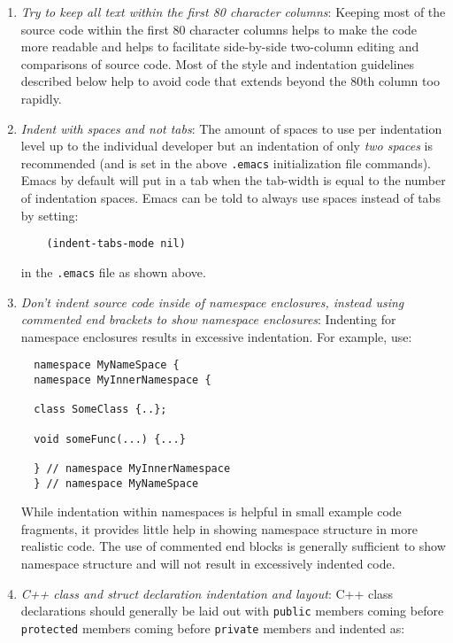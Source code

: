 \begin{enumerate}

{}\item\textit{Try to keep all text within the first 80 character columns}:
Keeping most of the source code within the first 80 character columns helps to
make the code more readable and helps to facilitate side-by-side two-column
editing and comparisons of source code.  Most of the style and indentation
guidelines described below help to avoid code that extends beyond the 80th
column too rapidly.

{}\item\textit{Indent with spaces and not tabs}: The amount of spaces to use
per indentation level up to the individual developer but an indentation of
only {}\textit{two spaces} is recommended (and is set in the above
{}\texttt{.emacs} initialization file commands).  Emacs by default will put in
a tab when the tab-width is equal to the number of indentation spaces.  Emacs
can be told to always use spaces instead of tabs by setting:

{\small\begin{verbatim}
    (indent-tabs-mode nil)
\end{verbatim}}

in the {}\texttt{.emacs} file as shown above.

{}\item\textit{Don't indent source code inside of namespace enclosures, instead
using commented end brackets to show namespace enclosures}: Indenting for
namespace enclosures results in excessive indentation.  For example, use:

{\small\begin{verbatim}
  namespace MyNameSpace {
  namespace MyInnerNamespace {

  class SomeClass {..};

  void someFunc(...) {...}

  } // namespace MyInnerNamespace
  } // namespace MyNameSpace
\end{verbatim}}

While indentation within namespaces is helpful in small example code
fragments, it provides little help in showing namespace structure in more
realistic code.  The use of commented end blocks is generally sufficient to
show namespace structure and will not result in excessively indented code.

{}\item\textit{C++ class and struct declaration indentation and layout}: C++
class declarations should generally be laid out with {}\texttt{public}
members coming before {}\texttt{protected} members coming before
{}\texttt{private} members and indented as:


\end{enumerate}
